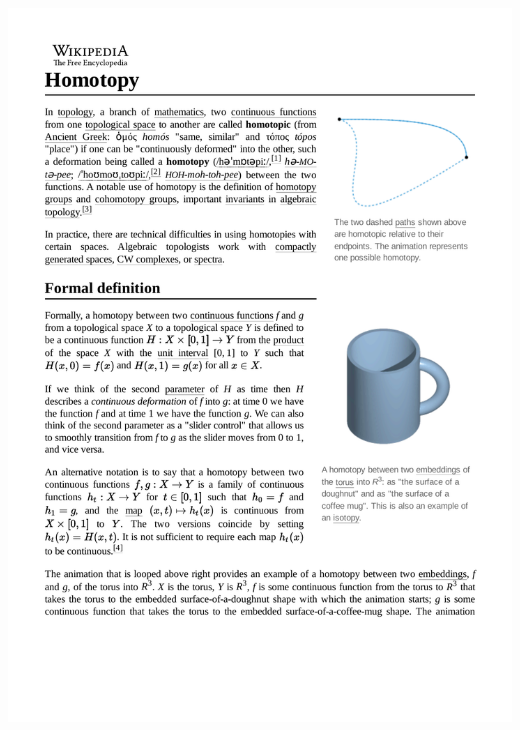 \documentclass{beamer}
\begin{document}
\begin{frame}
\includegraphics[width=\textwidth]{Homotopy.pdf}
\end{frame}
\end{document}
